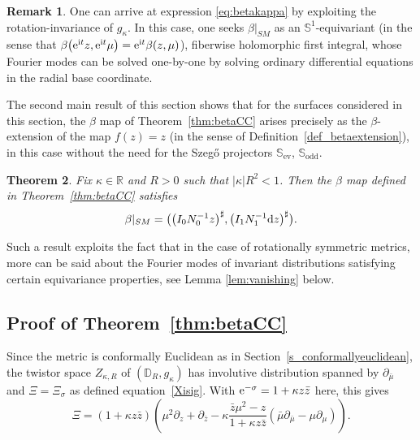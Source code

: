 \documentclass[10pt,a4paper]{amsart}
\numberwithin{equation}{section}
\newtheorem{Theorem}{Theorem}[section]
\theoremstyle{definition}
\newtheorem{Remark}[Theorem]{Remark}
\newcommand{\ev}{\mathrm{ev}}
\newcommand{\1}{{\bf 1}}
\newcommand \Dm { \mathbb{D}}
\newcommand \Rm { \mathbb{R}}
\newcommand \Sm { \mathbb{S}}
\newcommand \zbar { \bar{z}}
\newcommand \mubar {{\bar{\mu}}}
\begin{document}
\begin{Remark}
	One can arrive at expression \eqref{eq:betakappa} by exploiting the rotation-invariance of $g_\kappa$. In this case, one seeks $\beta|_{SM}$ as an $\Sm^1$-equivariant (in the sense that $\beta\bigl({\rm e}^{{\rm i}t}z,{\rm e}^{{\rm i}t}\mu\bigr) = {\rm e}^{{\rm i}t} \beta(z,\mu)$), fiberwise holomorphic first integral, whose Fourier modes can be solved one-by-one by solving ordinary differential equations in the radial base coordinate.
\end{Remark}

The second main result of this section shows that for the surfaces considered in this section, the $\beta$ map of Theorem~\ref{thm:betaCC} arises precisely as the $\beta$-extension of the map $f(z) = z$ (in the sense of Definition~\ref{def_betaextension}), in this case without the need for the Szeg\H{o} projectors $\mathbb S_{\ev}$, $\mathbb S_{\mathrm{odd}}$.

\begin{Theorem}\label{thm:preimages}
	Fix $\kappa\in \Rm$ and $R>0$ such that $|\kappa| R^2<1$. Then the $\beta$ map defined in Theorem~{\rm\ref{thm:betaCC}} satisfies
	\begin{align*}
		\beta|_{SM} =\bigl(\bigl(I_0 N_0^{-1} z\bigr)^\sharp, \bigl(I_1 N_1^{-1} {\rm d}z\bigr)^\sharp\bigr).
	\end{align*}
\end{Theorem}

Such a result exploits the fact that in the case of rotationally symmetric metrics, more can be said about the Fourier modes of invariant distributions satisfying certain equivariance properties, see Lemma \ref{lem:vanishing} below.

\subsection[Proof of Theorem 4.1]{Proof of Theorem~\ref{thm:betaCC}} \label{ssec:proofbetaCC}

Since the metric is conformally Euclidean as in Section~\ref{s_conformallyeuclidean}, the twistor space $Z_{\kappa,R}$ of $(\Dm_R, g_\kappa)$ has involutive distribution spanned by $\partial_{\mubar}$ and $\Xi = \Xi_\sigma$ as defined equation~\eqref{Xisig}. With ${\rm e}^{-\sigma} = 1+\kappa z \zbar$ here, this gives
\[ %
	\Xi = (1+\kappa z\zbar) \left( \mu^2 \partial_z + \partial_{\zbar} - \kappa \frac{\zbar \mu^2-z}{1+\kappa z\zbar} (\mubar \partial_{\mubar} - \mu\partial_\mu) \right).	
\]
\end{document}
